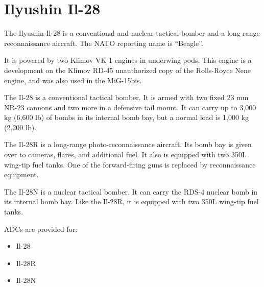 \section*{Ilyushin Il-28}

The Ilyushin Il-28 is a conventional and nuclear tactical bomber and a long-range reconnaissance aircraft. The NATO reporting name is “Beagle”.

It is powered by two Klimov VK-1 engines in underwing pods. This engine is a development on the Klimov RD-45 unauthorized copy of the Rolls-Royce Nene engine, and was also used in the MiG-15bis.

The Il-28 is a conventional tactical bomber. It is armed with two fixed 23 mm NR-23 cannons and two more in a defensive tail mount. It can carry up to 3,000 kg (6,600 lb) of bombs in its internal bomb bay, but a normal load is 1,000 kg (2,200 lb).

The Il-28R is a long-range photo-reconnaissance aircraft. Its bomb bay is given over to cameras, flares, and additional fuel. It also is equipped with two 350L wing-tip fuel tanks. One of the forward-firing guns is replaced by reconnaissance equipment.

The Il-28N is a nuclear tactical bomber. It can carry the RDS-4 nuclear bomb in its internal bomb bay. Like the Il-28R, it is equipped with two 350L wing-tip fuel tanks.

ADCs are provided for:
\begin{itemize}
    \item Il-28
    \item Il-28R
    \item Il-28N
\end{itemize}